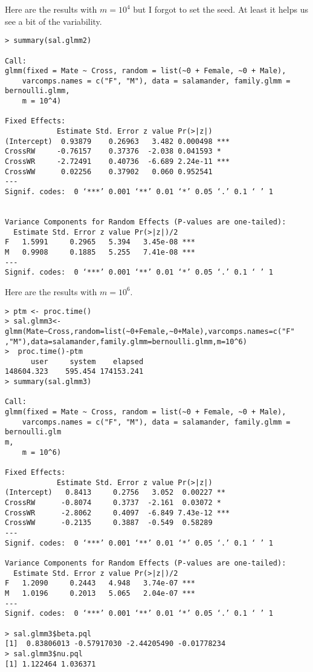 \documentclass{article}
\begin{document}
Here are the results with $m=10^4$ but I forgot to set the seed. At least it helps us see a bit of the variability.
\begin{verbatim}
> summary(sal.glmm2)

Call:
glmm(fixed = Mate ~ Cross, random = list(~0 + Female, ~0 + Male), 
    varcomps.names = c("F", "M"), data = salamander, family.glmm = bernoulli.glmm, 
    m = 10^4)

Fixed Effects:
            Estimate Std. Error z value Pr(>|z|)    
(Intercept)  0.93879    0.26963   3.482 0.000498 ***
CrossRW     -0.76157    0.37376  -2.038 0.041593 *  
CrossWR     -2.72491    0.40736  -6.689 2.24e-11 ***
CrossWW      0.02256    0.37902   0.060 0.952541    
---
Signif. codes:  0 ‘***’ 0.001 ‘**’ 0.01 ‘*’ 0.05 ‘.’ 0.1 ‘ ’ 1


Variance Components for Random Effects (P-values are one-tailed):
  Estimate Std. Error z value Pr(>|z|)/2    
F   1.5991     0.2965   5.394   3.45e-08 ***
M   0.9908     0.1885   5.255   7.41e-08 ***
---
Signif. codes:  0 ‘***’ 0.001 ‘**’ 0.01 ‘*’ 0.05 ‘.’ 0.1 ‘ ’ 1
\end{verbatim}




Here are the results with $m=10^6$. 
\begin{verbatim}
> ptm <- proc.time()
> sal.glmm3<-glmm(Mate~Cross,random=list(~0+Female,~0+Male),varcomps.names=c("F"
,"M"),data=salamander,family.glmm=bernoulli.glmm,m=10^6)
>  proc.time()-ptm
      user     system    elapsed 
148604.323    595.454 174153.241 
> summary(sal.glmm3)

Call:
glmm(fixed = Mate ~ Cross, random = list(~0 + Female, ~0 + Male), 
    varcomps.names = c("F", "M"), data = salamander, family.glmm = bernoulli.glm
m, 
    m = 10^6)

Fixed Effects:
            Estimate Std. Error z value Pr(>|z|)    
(Intercept)   0.8413     0.2756   3.052  0.00227 ** 
CrossRW      -0.8074     0.3737  -2.161  0.03072 *  
CrossWR      -2.8062     0.4097  -6.849 7.43e-12 ***
CrossWW      -0.2135     0.3887  -0.549  0.58289    
---
Signif. codes:  0 ‘***’ 0.001 ‘**’ 0.01 ‘*’ 0.05 ‘.’ 0.1 ‘ ’ 1

Variance Components for Random Effects (P-values are one-tailed):
  Estimate Std. Error z value Pr(>|z|)/2    
F   1.2090     0.2443   4.948   3.74e-07 ***
M   1.0196     0.2013   5.065   2.04e-07 ***
---
Signif. codes:  0 ‘***’ 0.001 ‘**’ 0.01 ‘*’ 0.05 ‘.’ 0.1 ‘ ’ 1

> sal.glmm3$beta.pql
[1]  0.83806013 -0.57917030 -2.44205490 -0.01778234
> sal.glmm3$nu.pql
[1] 1.122464 1.036371

\end{verbatim}
\end{document}
